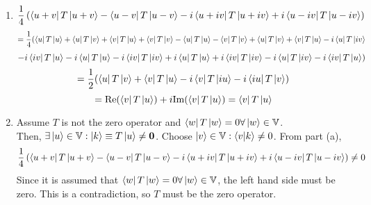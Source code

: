 \begin{sol}
\begin{enumerate}[label=\textbf{(\alph*)}]
\item
\begin{equation}
	\frac{1}{4}\left(\bra{u+v}T\ket{u+v}-\bra{u-v}T\ket{u-v}-i\bra{u+iv}T\ket{u+iv}+i\bra{u-iv}T\ket{u-iv}\right)
\end{equation}
\begin{equation}
	=\frac{1}{4}(\bra uT\ket u+\bra uT\ket v+\bra vT\ket u+\bra vT\ket v-\bra uT\ket u-\bra vT\ket v+\bra uT\ket v+\bra vT\ket u-i\bra uT\ket{iv}
\end{equation}\begin{equation}
	-i\bra{iv}T\ket u-i\bra uT\ket u-i\bra{iv}T\ket{iv}+i\bra u T\ket u+i\bra {iv}T\ket{iv}-i\bra uT\ket{iv}-i\bra{iv}T\ket{u})
\end{equation}
\begin{equation}
	=\frac{1}{2}(\bra uT\ket v+\bra vT\ket u-i\bra vT\ket{iu}-i\bra{iu}T\ket v)
\end{equation}
\begin{equation}
	=\text{Re}(\bra vT\ket u)+i\text{Im}(\bra{v}T\ket u)=\bra vT\ket u
\end{equation}
\item
Assume $T$ is not the zero operator and $\bra w T\ket w=0\forall\ket w\in\mathbb V$.\\ Then, $\exists\ket u\in \mathbb V:\ket k\equiv T\ket u\neq \mathbf 0$. Choose $\ket v\in\mathbb V:\braket{v}{k}\neq 0$. From part (a), 
\begin{equation}
	\frac{1}{4}\left(\bra{u+v}T\ket{u+v}-\bra{u-v}T\ket{u-v}-i\bra{u+iv}T\ket{u+iv}+i\bra{u-iv}T\ket{u-iv}\right)\neq 0
\end{equation}
Since it is assumed that $\bra w T\ket w=0\forall\ket w\in\mathbb V$, the left hand side must be zero. This is a contradiction, so $T$ must be the zero operator.
\end{enumerate}
\end{sol}